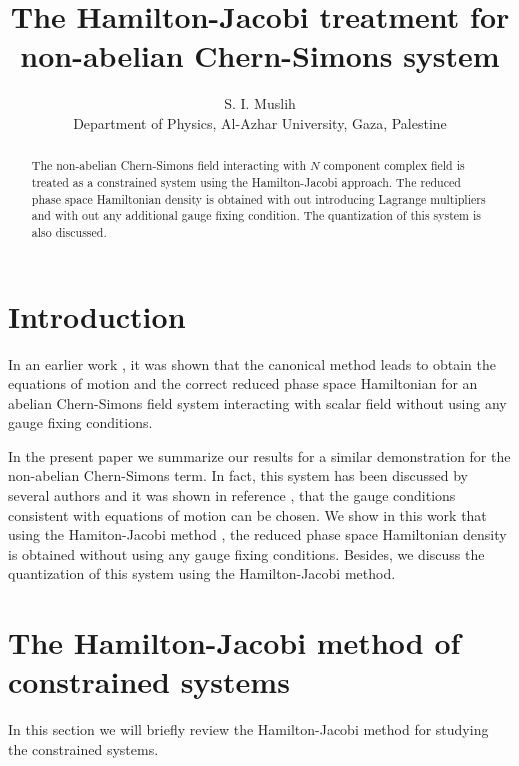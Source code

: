 \documentclass[a4paper,12pt]{article}
\begin{document}
\title{The Hamilton-Jacobi treatment for non-abelian Chern-Simons
system}\maketitle
\begin{center}
\author{S. I. Muslih\\{Department of Physics,
Al-Azhar University, Gaza, Palestine}}
\end{center}
\begin{abstract}
The non-abelian Chern-Simons field interacting with $N$ component
complex field is treated as a constrained system using the
Hamilton-Jacobi approach. The reduced phase space Hamiltonian
density is obtained with out introducing Lagrange multipliers and
with out any additional gauge fixing condition. The quantization
of this system is also discussed.
\end{abstract}
\newpage
\setcounter{section}{0}

\section{Introduction}

 In an earlier work \cite{sm1}, it was shown that the canonical method \cite{sm2,gl} leads  to obtain the equations of
motion and the correct reduced phase space Hamiltonian for an
abelian Chern-Simons field system interacting with scalar field
without using any gauge fixing conditions.

In the present paper we summarize our results for a similar
demonstration for the non-abelian Chern-Simons term. In fact,
this system has been discussed by several authors
\cite{fer,des,shar} and it was shown in reference \cite{shar},
that the gauge conditions consistent with equations of motion can
be chosen. We show in this work that using the Hamiton-Jacobi
method \cite{sm2,gl}, the reduced phase space Hamiltonian density
is obtained without using any gauge fixing conditions. Besides, we
discuss the quantization of this system using the Hamilton-Jacobi
method.

\section{The Hamilton-Jacobi method of constrained systems}
In this section we will briefly review the Hamilton-Jacobi
method  \cite{sm2,gl} for studying the constrained systems.
\end{document}
